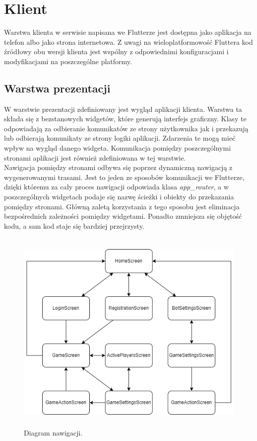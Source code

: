 \section{Klient}

Warstwa klienta w serwisie napisana we Flutterze jest dostępna jako aplikacja na telefon albo jako strona internetowa. Z uwagi na wieloplatformowość Fluttera kod źródłowy obu wersji klienta jest wspólny z odpowiednimi konfiguracjami i modyfikacjami na poszczególne platformy.

\subsection{Warstwa prezentacji}

W warstwie prezentacji zdefiniowany jest wygląd aplikacji klienta. Warstwa ta składa się z bezstanowych widgetów, które generują interfejs graficzny. Klasy te odpowiadają za odbieranie
komunikatów ze strony użytkownika jak i przekazują lub odbierają komunikaty ze strony logiki aplikacji. Zdarzenia te mogą mieć wpływ na wygląd danego widgeta. Komunikacja pomiędzy poszczególnymi stronami aplikacji jest również zdefiniowana w tej warstwie. \\

Nawigacja pomiędzy stronami odbywa się poprzez dynamiczną nawigacją z wygenerowanymi trasami. Jest to jeden ze sposobów komunikacji we Flutterze, dzięki któremu za cały proces nawigacji odpowiada klasa \emph{app\_router}, a w poszczególnych widgetach podaje się nazwę ścieżki i obiekty do przekazania pomiędzy stronami. Główną zaletą korzystania z tego sposobu jest eliminacja bezpośrednich zależności pomiędzy widgetami. Ponadto zmniejsza się objętość kodu, a sam kod staje się bardziej przejrzysty.

\begin{figure}[h!]
	\begin{center}
		\includegraphics[width=13cm,height=10cm]{img/nawigacja.png}
	\end{center}
	\caption{{\color{dgray}Diagram nawigacji.}} 
	\label{nawigacja}
\end{figure}  

